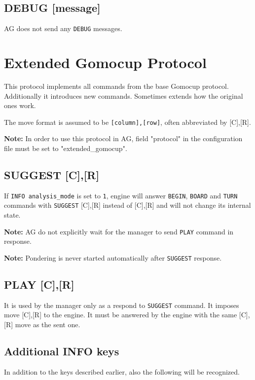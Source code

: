 \documentclass[12pt,a4paper]{article}
\begin{document}
\subsection{DEBUG [message]}
\label{cmd_debug}
AG does not send any \texttt{DEBUG} messages.


\newpage
\section{Extended Gomocup Protocol}
This protocol implements all commands from the base Gomocup protocol. Additionally it introduces new commands. Sometimes extends how the original ones work.

The move format is assumed to be \texttt{[column],[row]}, often abbreviated by [C],[R].

\textbf{Note:} In order to use this protocol in AG, field "protocol" in the configuration file must be set to "extended{\_}gomocup".

\subsection{SUGGEST [C],[R]}
\label{cmd_suggest}
If \texttt{INFO analysis{\_}mode} is set to \texttt{1}, engine will answer \texttt{BEGIN}, \texttt{BOARD} and \texttt{TURN} commands with \texttt{SUGGEST} [C],[R] instead of [C],[R] and will not change its internal state.

\textbf{Note:} AG do not explicitly wait for the manager to send \texttt{PLAY} command in response.

\textbf{Note:} Pondering is never started automatically after \texttt{SUGGEST} response.


\subsection{PLAY [C],[R]}
\label{cmd_play}
It is used by the manager only as a respond to \texttt{SUGGEST} command. It imposes move [C],[R] to the engine. It must be answered by the engine with the same [C],[R] move as the sent one.


\subsection{Additional INFO keys}
\label{cmd_info_extension1}
In addition to the keys described earlier, also the following will be recognized.
\end{document}
